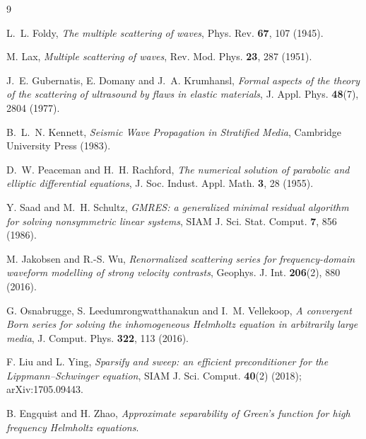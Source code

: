 \documentclass[11pt,a4paper]{article}
\begin{document}
\begin{thebibliography}{9}

 L.~L. Foldy, \emph{The multiple scattering of waves}, Phys. Rev.
\textbf{67}, 107 (1945).

 M. Lax, \emph{Multiple scattering of waves}, Rev. Mod. Phys. \textbf{23}, 287
(1951).

 J.~E. Gubernatis, E. Domany and J.~A. Krumhansl,
\emph{Formal aspects of the theory of the scattering of ultrasound by flaws in elastic
materials}, J. Appl. Phys. \textbf{48}(7), 2804 (1977).

 B.~L.~N. Kennett, \emph{Seismic Wave Propagation in Stratified Media},
Cambridge University Press (1983).

 D.~W. Peaceman and H.~H. Rachford, \emph{The numerical solution
of parabolic and elliptic differential equations}, J. Soc. Indust. Appl. Math. \textbf{3}, 28
(1955).

 Y. Saad and M.~H. Schultz, \emph{GMRES: a generalized minimal residual
algorithm for solving nonsymmetric linear systems}, SIAM J. Sci. Stat. Comput. \textbf{7}, 856
(1986).

 M. Jakobsen and R.-S. Wu, \emph{Renormalized scattering series for
frequency-domain waveform modelling of strong velocity contrasts}, Geophys. J. Int.
\textbf{206}(2), 880 (2016).

 G. Osnabrugge, S. Leedumrongwatthanakun and I.~M. Vellekoop, \emph{A
convergent Born series for solving the inhomogeneous Helmholtz equation in arbitrarily large
media}, J. Comput. Phys. \textbf{322}, 113 (2016).

 F. Liu and L. Ying, \emph{Sparsify and sweep: an efficient preconditioner
for the Lippmann--Schwinger equation}, SIAM J. Sci. Comput. \textbf{40}(2) (2018);
arXiv:1705.09443.

 B. Engquist and H. Zhao, \emph{Approximate separability of Green's
function for high frequency Helmholtz equations}.

\end{thebibliography}
\end{document}

